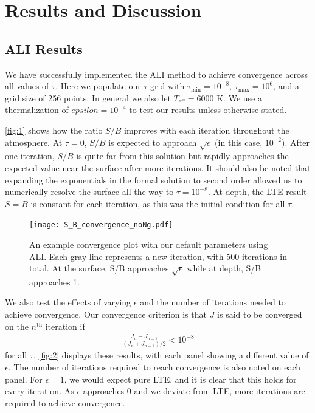 \documentclass[12pt]{article}
\begin{document}
\section{Results and Discussion}
\label{sec:results}


\subsection{ALI Results}
\label{sec:ali}


We have successfully implemented the ALI method to achieve convergence across all values of $\tau$. Here we populate our $\tau$ grid with $\tau_\text{min} = 10^{-8}$, $\tau_\text{max} = 10^6$, and a grid size of 256 points. In general we also let $T_\text{eff} = 6000$ K. We use a thermalization of $epsilon = 10^{-4}$ to test our results unless otherwise stated.

\autoref{fig:1} shows how the ratio $S / B$ improves with each iteration throughout the atmosphere. At $\tau = 0$, $S / B$ is expected to approach $\sqrt\epsilon$ (in this case, $10^{-2}$). After one iteration, $S / B$ is quite far from this solution but rapidly approaches the expected value near the surface after more iterations. It should also be noted that expanding the exponentials in the formal solution to second order allowed us to numerically resolve the surface all the way to $\tau = 10^{-8}$. At depth, the LTE result $S = B$ is constant for each iteration, as this was the initial condition for all $\tau$.

\begin{figure}[ht]
 \centering
 \texttt{[image: S\_B\_convergence\_noNg.pdf]}
 \caption{An example convergence plot with our default parameters using ALI. Each gray line represents a new iteration, with 500 iterations in total. At the surface, S/B approaches $\sqrt\epsilon$ while at depth, S/B approaches 1.}
 \label{fig:1}
\end{figure}

We also test the effects of varying $\epsilon$ and the number of iterations needed to achieve convergence. Our convergence criterion is that $J$ is said to be converged on the $n^\text{th}$ iteration if
\begin{align}
\frac{J_n - J_{n - 1}}{(J_n + J_{n - 1}) / 2} < 10^{-8}
\end{align}
for all $\tau$. \autoref{fig:2} displays these results, with each panel showing a different value of $\epsilon$. The number of iterations required to reach convergence is also noted on each panel. For $\epsilon = 1$, we would expect pure LTE, and it is clear that this holds for every iteration. As $\epsilon$ approaches 0 and we deviate from LTE, more iterations are required to achieve convergence.
\end{document}

